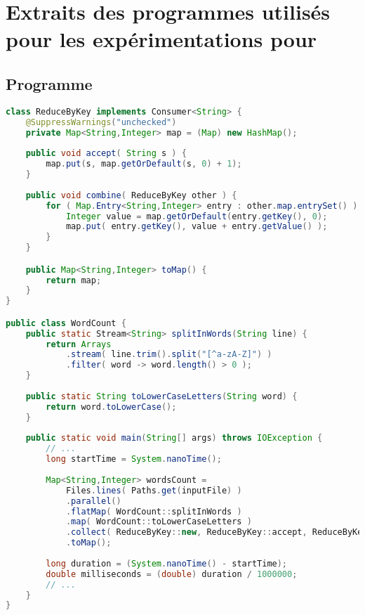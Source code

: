\chapter{Extraits des programmes utilisés pour les expérimentations pour }
\label{appendice-code-wordcount.ann}

\section{Programme }

\begin{lstlisting}[basicstyle=\ttfamily\footnotesize,language=java]
class ReduceByKey implements Consumer<String> {
    @SuppressWarnings("unchecked")
    private Map<String,Integer> map = (Map) new HashMap();
    
    public void accept( String s ) {
        map.put(s, map.getOrDefault(s, 0) + 1);
    }
    
    public void combine( ReduceByKey other ) {
        for ( Map.Entry<String,Integer> entry : other.map.entrySet() ) {
            Integer value = map.getOrDefault(entry.getKey(), 0);
            map.put( entry.getKey(), value + entry.getValue() );
        } 
    }

    public Map<String,Integer> toMap() {
        return map;
    }
}

public class WordCount {
    public static Stream<String> splitInWords(String line) {
        return Arrays
            .stream( line.trim().split("[^a-zA-Z]") )
            .filter( word -> word.length() > 0 );
    }
    
    public static String toLowerCaseLetters(String word) {
        return word.toLowerCase();
    }
    
    public static void main(String[] args) throws IOException {
        // ...
        long startTime = System.nanoTime();
        
        Map<String,Integer> wordsCount = 
            Files.lines( Paths.get(inputFile) )
            .parallel()
            .flatMap( WordCount::splitInWords )
            .map( WordCount::toLowerCaseLetters )
            .collect( ReduceByKey::new, ReduceByKey::accept, ReduceByKey::combine )
            .toMap();
        
        long duration = (System.nanoTime() - startTime);
        double milliseconds = (double) duration / 1000000;
        // ...
    }
}        
\end{lstlisting}


